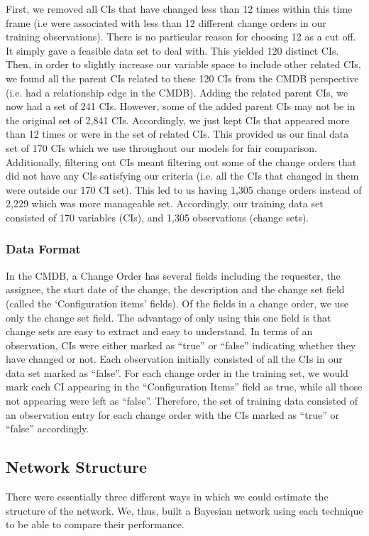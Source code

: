 \documentclass[10pt,twocolumn,letterpaper]{article}
\begin{document}
First, we removed all CIs that have changed less than 12 times within this time frame  (i.e were associated with less than 12 different change orders in our
training observations). There is no particular reason for choosing 12 as a cut off. It simply gave a feasible data set to deal with. This yielded 120 distinct
CIs. Then, in order to slightly increase our variable space to include other related CIs, we found all the parent CIs related to these 120 CIs from the CMDB
perspective (i.e. had a relationship edge in the CMDB). Adding the related parent CIs, we now had a set of 241 CIs. However, some of the added parent CIs may
not be in the original set of 2,841 CIs.
Accordingly, we just kept CIs that appeared more than 12 times or were in the set of related CIs. This provided us our final data set of 170 CIs which we use
throughout our models for fair comparison. Additionally, filtering out CIs meant filtering out some of the change orders that did not have any CIs satisfying
our criteria (i.e. all the CIs that changed in them were outside our 170 CI set). This led to us having 1,305 change orders instead of 2,229 which was more
manageable set. Accordingly, our training data set consisted of 170 variables (CIs), and 1,305 observations (change sets).

\subsubsection*{Data Format}
\label{sec:format}

In the CMDB, a Change Order has several fields including the requester, the assignee, the start date of the change, the description and the change set field
(called the `Configuration items' fields). Of the fields in a change order, we use only the change set field. The advantage of only using this one field is that
change sets are easy to extract and easy to understand. In terms of an observation, CIs were either marked as ``true'' or ``false'' indicating whether they
have changed or not. Each observation initially consisted of all the CIs in our data set marked as ``false''. For each change order in the training set, we
would
mark each CI appearing in the ``Configuration Items'' field as true, while all those not appearing were left as ``false''. Therefore, the set of training
data consisted of an observation entry for each change order with the CIs marked as ``true'' or ``false'' accordingly.

\subsection{Network Structure}
\label{sec:structure}
There were essentially three different ways in which we could estimate the structure of the network. We, thus, built a Bayesian network using each technique to
be able to compare their performance.
\end{document}
